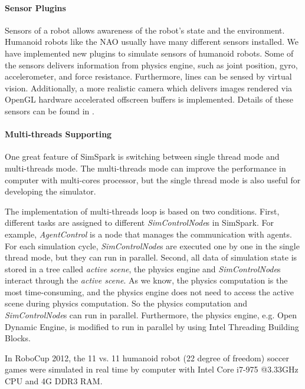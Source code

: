 \documentclass{llncs}
\begin{document}
\paragraph{Sensor Plugins}
Sensors of a robot allows awareness of the robot's state and the environment.
Humanoid robots like the NAO usually have many different sensors installed.
We have implemented new plugins to simulate sensors of humanoid robots.
Some of the sensors delivers information from physics engine, such as joint position, gyro, accelerometer, and force resistance. Furthermore, lines can be sensed by virtual vision.
Additionally, a more realistic camera which delivers images rendered via OpenGL hardware accelerated offscreen buffers is implemented. Details of these sensors can be found in \cite{usermanual}.

\paragraph{Multi-threads Supporting}
One great feature of SimSpark is switching between single thread mode and multi-threads
mode. The multi-threads mode can improve the performance in computer with multi-cores processor, but the single thread mode is also useful for developing the simulator. 

The implementation of multi-threads loop is based on two conditions.
First, different tasks are assigned to different \textit{SimControlNode}s in SimSpark.
For example, \textit{AgentControl} is a node that manages the communication with agents.
For each simulation cycle, \textit{SimControlNode}s are executed one by one in the single thread mode, but they can run in parallel.
Second, all data of simulation state is stored in a tree called \textit{active scene},
the physics engine and \textit{SimControlNode}s interact through the \textit{active scene}.
As we know, the physics computation is the most time-consuming, and the physics engine does not need to access the active scene during physics computation.
So the physics computation and \textit{SimControlNode}s can run in parallel.
Furthermore, the physics engine, e.g. Open Dynamic Engine\cite{Smith:ODE}, is modified to run in parallel by using Intel Threading Building Blocks\cite{tbb}.

In RoboCup 2012, the 11 vs. 11 humanoid robot (22 degree of freedom) soccer games were simulated in real time by computer with Intel Core i7-975 @3.33GHz CPU and 4G DDR3 RAM.
\end{document}
